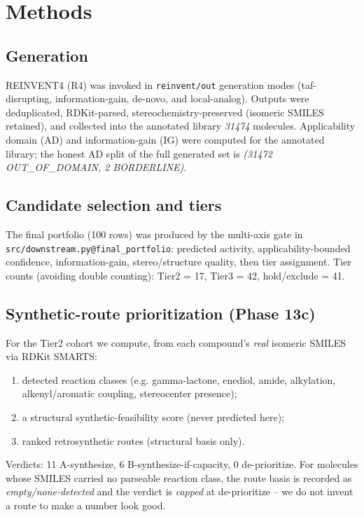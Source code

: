 \documentclass[11pt]{article}
\begin{document}
\section{Methods}
\subsection{Generation}
REINVENT4 (R4) was invoked in \texttt{reinvent/out} generation modes
(taf-disrupting, information-gain, de-novo, and local-analog). Outputs
were deduplicated, RDKit-parsed, stereochemistry-preserved (isomeric
SMILES retained), and collected into the annotated library
\emph{31474} molecules. Applicability domain (AD) and information-gain
(IG) were computed for the annotated library; the honest AD split of the
full generated set is
\emph{(31472 OUT\_OF\_DOMAIN, 2 BORDERLINE)}.

\subsection{Candidate selection and tiers}
The final portfolio (100 rows) was produced by the multi-axis gate in
\texttt{src/downstream.py@final\_portfolio}: predicted activity,
applicability-bounded confidence, information-gain, stereo/structure
quality, then tier assignment. Tier counts (avoiding double counting):
Tier2 = 17, Tier3 = 42, hold/exclude = 41.

\subsection{Synthetic-route prioritization (Phase 13c)}
For the Tier2 cohort we compute, from each compound's \emph{real}
isomeric SMILES via RDKit SMARTS:
\begin{enumerate}
\item detected reaction classes (e.g. gamma-lactone, enediol, amide,
alkylation, alkenyl/aromatic coupling, stereocenter presence);
\item a structural synthetic-feasibility score (never predicted here);
\item ranked retrosynthetic routes (structural basis only).
\end{enumerate}
Verdicts: 11 A-synthesize, 6 B-synthesize-if-capacity,
0 de-prioritize. For molecules whose SMILES carried no parseable
reaction class, the route basis is recorded as
\emph{empty/none-detected} and the verdict is \emph{capped} at
de-prioritize \--- we do not invent a route to make a number look good.
\end{document}
